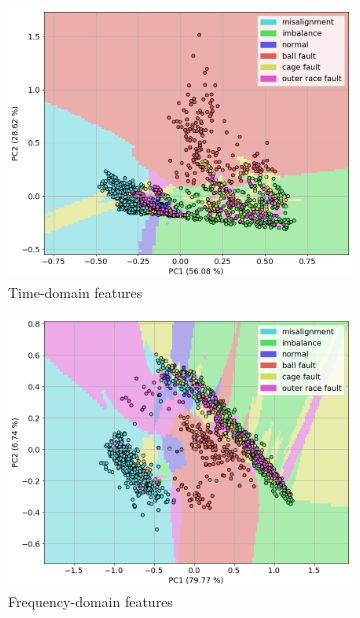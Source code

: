 \begin{figure}[h]
    \centering
    \begin{subfigure}[b]{0.48\textwidth}
        \includegraphics[width=\textwidth]{assets/results/labels/PCA-TD.png}
        \caption{Time-domain features}
    \end{subfigure}
    \hfill
    \begin{subfigure}[b]{0.48\textwidth}
        \includegraphics[width=\textwidth]{assets/results/labels/PCA-FD.png}
        \caption{Frequency-domain features}
    \end{subfigure}
    \hfill
    \begin{subfigure}[b]{0.48\textwidth}

\end{subfigure}
\end{figure}
